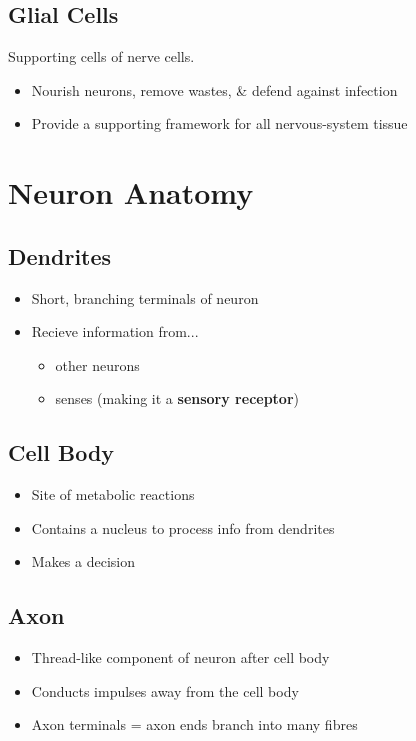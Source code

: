 \documentclass[a4paper,12pt]{article}
\begin{document}
\subsection{Glial Cells}
Supporting cells of nerve cells.
\begin{itemize}
    \item{Nourish neurons, remove wastes, \& defend against infection}
    \item{Provide a supporting framework for all nervous-system tissue}
\end{itemize}

\section{Neuron Anatomy}
\subsection{Dendrites}
\begin{itemize}
    \item{Short, branching terminals of neuron}
    \item{
            Recieve information from...
            \begin{itemize}
                \item{other neurons}
                \item{senses (making it a \textbf{sensory receptor})}
            \end{itemize}
        }
\end{itemize}

\subsection{Cell Body}
\begin{itemize}
    \item{Site of metabolic reactions}
    \item{Contains a nucleus to process info from dendrites}
    \item{Makes a decision}
\end{itemize}

\subsection{Axon}
\begin{itemize}
    \item{Thread-like component of neuron after cell body}
    \item{Conducts impulses away from the cell body}
    \item{Axon terminals = axon ends branch into many fibres}
\end{itemize}
\end{document}
